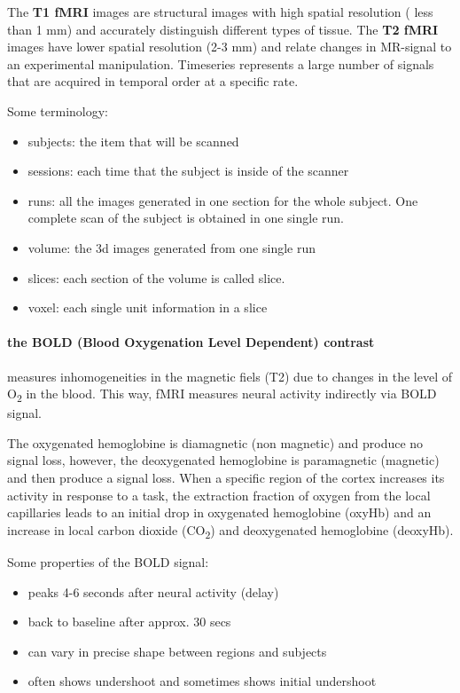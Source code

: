 \documentclass[12pt,article,oneside,a4paper]{memoir}
\begin{document}
The \textbf{T1 fMRI} images are structural images with high spatial resolution ( less than 1 mm) and accurately distinguish different types of tissue. The \textbf{T2 fMRI} images have lower spatial resolution (2-3 mm) and relate changes in MR-signal to an experimental manipulation. Timeseries represents a large number of signals that are acquired in temporal order at a specific rate.

Some terminology:
\begin{itemize}
\item subjects: the item that will be scanned
\item sessions: each time that the subject is inside of the scanner
\item runs: all the images generated in one section for the whole subject. One complete scan of the subject is obtained in one single run.
\item volume: the 3d images generated from one single run
\item slices: each section of the volume is called slice.
\item voxel: each single unit information in a slice
\end{itemize}

\paragraph{the BOLD (Blood Oxygenation Level Dependent) contrast}\label{bold-fmri} measures inhomogeneities in the magnetic fiels (T2) due to changes in the level of O\textsubscript{2} in the blood. This way, fMRI measures neural activity indirectly via BOLD signal.

The oxygenated hemoglobine is diamagnetic (non magnetic) and produce no signal loss, however, the deoxygenated hemoglobine is paramagnetic (magnetic) and then produce a signal loss. When a specific region of the cortex increases its activity in response to a task, the extraction fraction of oxygen from the local capillaries leads to an initial drop in oxygenated hemoglobine (oxyHb) and an increase in local carbon dioxide (CO\textsubscript{2}) and deoxygenated hemoglobine (deoxyHb). 

Some properties of the BOLD signal:
\begin{itemize}
\item peaks 4-6 seconds after neural activity (delay)
\item back to baseline after approx. 30 secs
\item can vary in precise shape between regions and subjects
\item often shows undershoot and sometimes shows initial undershoot
\end{itemize}
\end{document}
